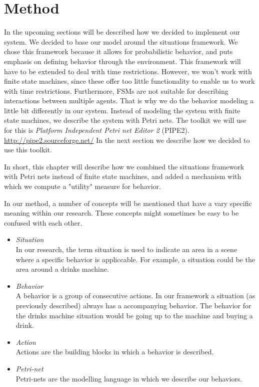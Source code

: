 \documentclass[11pt]{book}
\begin{document}
\chapter{Method}
In the upcoming sections will be described how we decided to implement our system. We decided to base our model around the situations framework. We chose this framework because it allows for probabilistic behavior, and puts emphasis on defining behavior through the environment. This framework will have to be extended to deal with time restrictions. However, we won't work with finite state machines, since these offer too little functionality to enable us to work with time restrictions. Furthermore, FSMs are not suitable for describing interactions between multiple agents. That is why we do the behavior modeling a little bit differently in our system. Instead of modeling the system with finite state machines, we describe the system with Petri nets.  The toolkit we will use for this is \emph{Platform Independent Petri net Editor 2} (PIPE2). \url{http://pipe2.sourceforge.net/} In the next section we describe how we decided to use this toolkit.

In short, this chapter will describe how we combined the situations framework with Petri nets instead of finite state machines, and added a mechanism with which we compute a "utility" measure for behavior.

In our method, a number of concepts will be mentioned that have a vary specific meaning within our research. These concepts might sometimes be easy to be confused with each other.
\begin{itemize}
\item \emph{Situation}\\
In our research, the term situation is used to indicate an area in a scene where a specific behavior is appliccable. For example, a situation could be the area around a drinks machine.
\item \emph{Behavior}\\
A behavior is a group of consecutive actions. In our framework a situation (as previously described) always has a accompanying behavior. The behavior for the drinks machine situation would be going up to the machine and buying a drink.
\item \emph{Action}\\
Actions are the building blocks in which a behavior is described.
\item \emph{Petri-net}\\
Petri-nets are the modelling language in which we describe our behaviors.
\end{itemize}
\end{document}
